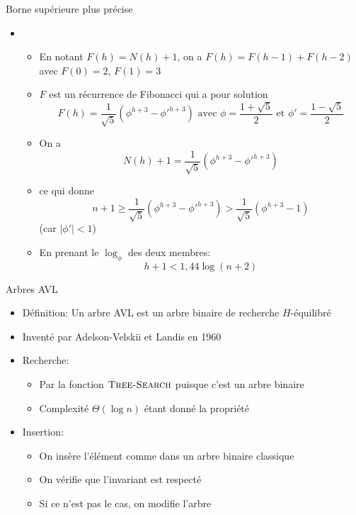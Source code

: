 \begin{frame}{Borne supérieure plus précise}
\begin{itemize}
\item[]
\begin{itemize}
\item En notant $F(h)=N(h)+1$, on a $F(h)=F(h-1)+F(h-2)$ avec $F(0)=2$, $F(1)=3$
\item $F$ est un récurrence de Fibonacci qui a pour solution
 $$F(h)=\frac{1}{\sqrt{5}} (\phi^{h+3}-\phi'^{h+3})\mbox{ avec }\phi=\frac{1+\sqrt{5}}{2}\mbox{ et }\phi'=\frac{1-\sqrt{5}}{2}$$
\item On a $$N(h)+1=\frac{1}{\sqrt{5}} (\phi^{h+3}-\phi'^{h+3})$$
\item ce qui donne
$$n+1\geq \frac{1}{\sqrt{5}} (\phi^{h+3}-\phi'^{h+3})> \frac{1}{\sqrt{5}} (\phi^{h+3}-1)$$
(car $|\phi'|<1$)
\item En prenant le $\log_{\phi}$ des deux membres:
$$h+1<1,44\log (n+2)$$
\end{itemize}
\end{itemize}

\end{frame}

\begin{frame}{Arbres AVL}

\begin{itemize}
\item \alert{Définition:} Un arbre AVL est un arbre binaire de
  recherche $H$-équilibré
\item Inventé par Adelson-Velskii et Landis en 1960
\item Recherche:
\begin{itemize}
\item Par la fonction $\textnormal{\scshape Tree-Search}$ puisque c'est un arbre binaire
\item Complexité $\Theta(\log n)$ étant donné la propriété
\end{itemize}
\item Insertion:
\begin{itemize}
\item On insère l'élément comme dans un arbre binaire classique
\item On vérifie que l'invariant est respecté
\item Si ce n'est pas le cas, on modifie l'arbre
\end{itemize}
\end{itemize}
\end{frame}

